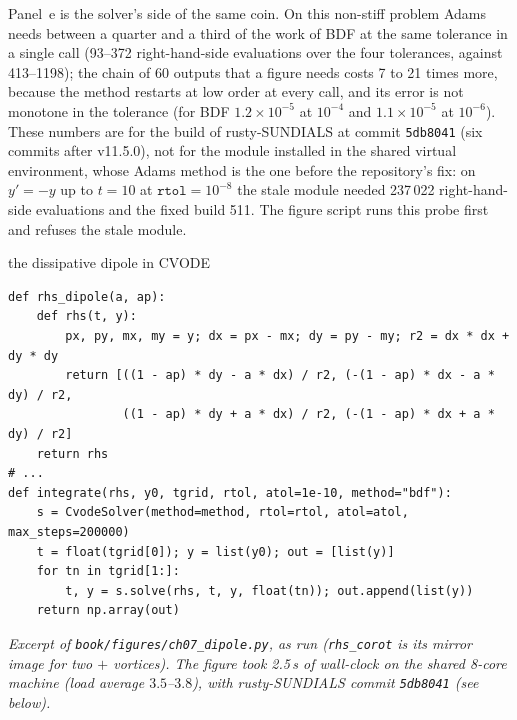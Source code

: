 Panel~e is the solver's side of the same coin. On this non-stiff problem Adams needs between a quarter and a third of the work of BDF at the same tolerance in a single call (93--372 right-hand-side evaluations over the four tolerances, against 413--1198); the chain of $60$ outputs that a figure needs costs 7 to 21 times more, because the method restarts at low order at every call, and its error is not monotone in the tolerance (for BDF $1.2\times10^{-5}$ at $10^{-4}$ and $1.1\times10^{-5}$ at $10^{-6}$).
These numbers are for the build of rusty-SUNDIALS at commit \texttt{5db8041} (six commits after v11.5.0), not for the module installed in the shared virtual environment, whose Adams method is the one before the repository's fix: on $y'=-y$ up to $t=10$ at $\texttt{rtol}=10^{-8}$ the stale module needed 237\,022 right-hand-side evaluations and the fixed build 511. The figure script runs this probe first and refuses the stale module.

\begin{rustbox}[unbreakable]{the dissipative dipole in CVODE}
\begin{lstlisting}[style=py,basicstyle=\ttfamily\footnotesize]
def rhs_dipole(a, ap):
    def rhs(t, y):
        px, py, mx, my = y; dx = px - mx; dy = py - my; r2 = dx * dx + dy * dy
        return [((1 - ap) * dy - a * dx) / r2, (-(1 - ap) * dx - a * dy) / r2,
                ((1 - ap) * dy + a * dx) / r2, (-(1 - ap) * dx + a * dy) / r2]
    return rhs
# ...
def integrate(rhs, y0, tgrid, rtol, atol=1e-10, method="bdf"):
    s = CvodeSolver(method=method, rtol=rtol, atol=atol, max_steps=200000)
    t = float(tgrid[0]); y = list(y0); out = [list(y)]
    for tn in tgrid[1:]:
        t, y = s.solve(rhs, t, y, float(tn)); out.append(list(y))
    return np.array(out)
\end{lstlisting}
\nopagebreak[4]\smallskip\noindent\textit{Excerpt of \texttt{book/figures/ch07\_dipole.py}, as run (\texttt{rhs\_corot} is its mirror image for two $+$ vortices). The figure took 2.5\,s of wall-clock on the shared 8-core machine (load average $3.5$--$3.8$), with rusty-SUNDIALS commit \texttt{5db8041} (see below).}
\end{rustbox}

